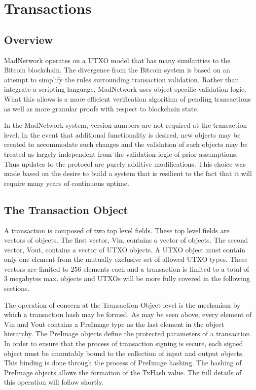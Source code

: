 \section{Transactions}
\subsection{Overview}



MadNetwork operates on a UTXO model that has many similarities to the
Bitcoin blockchain.
The divergence from the Bitcoin system is based on an attempt to
simplify the rules surrounding transaction validation.
Rather than integrate a scripting language, MadNetwork uses object
specific validation logic.
What this allows is a more efficient verification algorithm of pending
transactions as well as more granular proofs with respect to blockchain
state.

In the MadNetwork system, version numbers are not required at the
transaction level.
In the event that additional functionality is desired, new objects may
be created to accommodate such changes and the validation of such
objects may be treated as largely independent from the validation logic
of prior assumptions.
Thus updates to the protocol are purely additive modifications.
This choice was made based on the desire to build a system that is
resilient to the fact that it will require many years of continuous
uptime.


\subsection{The Transaction Object}

A transaction is composed of two top level fields.
These top level fields are vectors of objects.
The first vector, Vin, contains a vector of \TxIn{} objects.
The second vector, Vout, contains a vector of UTXO objects.
A UTXO object must contain only one element from the mutually exclusive set of
allowed UTXO types.
These vectors are limited to 256 elements each and a transaction is limited to
a total of 3 megabytes max.
\TxIn{} objects and UTXOs will be more fully covered in the following sections.

The operation of concern at the Transaction Object level is the mechanism by
which a transaction hash may be formed.
As may be seen above, every element of Vin and Vout contains a PreImage type as
the last element in the object hierarchy.
The PreImage objects define the protected parameters of a transaction.
In order to ensure that the process of transaction signing is secure, each
signed object must be immutably bound to the collection of input and output
objects.
This binding is done through the process of PreImage hashing.
The hashing of PreImage objects allows the formation of the TxHash value.
The full details of this operation will follow shortly.

